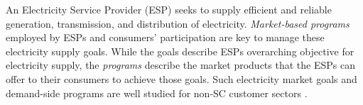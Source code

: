 %
%
%
\label{sub:EPP}
An Electricity Service Provider (ESP) seeks to supply efficient and reliable generation, transmission, and distribution of electricity. \emph{Market-based programs} employed by ESPs and consumers' participation are key to manage these electricity supply goals. While the goals describe ESPs overarching objective for electricity supply, the \textit{programs} describe the market products that the ESPs can offer to their consumers to achieve those goals. Such electricity market goals and demand-side programs are well studied for non-SC customer sectors \cite{Palensky2011}. 

